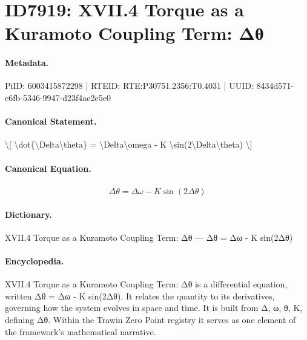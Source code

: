 \section*{ID7919: XVII.4 Torque as a Kuramoto Coupling Term: Δθ}
\paragraph{Metadata.}
PiID: 6003415872298 | RTEID: RTE:P30751.2356:T0.4031 | UUID: 8434d571-e6fb-5346-9947-d23f4ae2e5e0

\paragraph{Canonical Statement.}
\textbackslash{}[ \textbackslash{}dot\{\textbackslash{}Delta\textbackslash{}theta\} = \textbackslash{}Delta\textbackslash{}omega - K \textbackslash{}sin(2\textbackslash{}Delta\textbackslash{}theta) \textbackslash{}]

\paragraph{Canonical Equation.}
\[
\dot{\Delta\theta} = \Delta\omega - K \sin(2\Delta\theta)
\]

\paragraph{Dictionary.}
XVII.4 Torque as a Kuramoto Coupling Term: Δθ — Δθ = Δω - K sin(2Δθ)

\paragraph{Encyclopedia.}
XVII.4 Torque as a Kuramoto Coupling Term: Δθ is a differential equation, written Δθ = Δω - K sin(2Δθ). It relates the quantity to its derivatives, governing how the system evolves in space and time. It is built from Δ, ω, θ, K, defining Δθ. Within the Trawin Zero Point registry it serves as one element of the framework's mathematical narrative.

